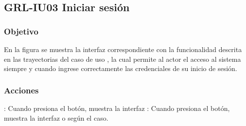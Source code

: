 \clearpage
\subsection{GRL-IU03 Iniciar sesión}

\subsubsection{Objetivo}
En la figura  se muestra la interfaz correspondiente con la funcionalidad descrita en las
trayectorias del caso de uso  , la cual permite al actor el acceso al sistema
siempre y cuando ingrese correctamente las credenciales de su inicio de sesión.

\subsubsection{Acciones}


\Titem {} : Cuando presiona el botón, muestra la interfaz %
\Titem {} : Cuando presiona el botón, muestra la interfaz  o  según el caso.



\clearpage
